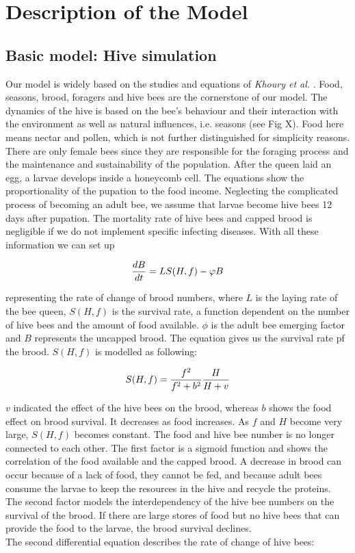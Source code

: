 \section{Description of the Model}
\subsection{Basic model: Hive simulation}
	Our model is widely based on the studies and equations of \textit{Khoury et al.} \cite{khoury13}. Food, seasons, brood, foragers and hive bees are the cornerstone of our model. The dynamics of the hive is based on the bee's behaviour and their interaction with the environment as well as natural influences, i.e. seasons (see Fig X). Food here means nectar and pollen, which is not further distinguished for simplicity reasons. There are only female bees since they are responsible for the foraging process and the maintenance and sustainability of the population. After the queen laid an egg, a larvae develops inside a honeycomb cell. The equations show the proportionality of the pupation to the food income. Neglecting the complicated process of becoming an adult bee, we assume that larvae become hive bees 12 days after pupation. The mortality rate of hive bees and capped brood is negligible if we do not implement specific infecting diseases. With all these information we can set up
	
	\begin{equation}\label{eq:changeBroodNumbers}
		{dB \over dt} = LS(H,f)-\phi B
	\end{equation}
	
	representing the rate of change of brood numbers, where $L$ is the laying rate of the bee queen, $S(H,f)$ is the survival rate, a function dependent on the number of hive bees and the amount of food available. $\phi$ is the adult bee emerging factor and $B$ represents the uncapped brood. The equation gives us the survival rate pf the brood. $S(H,f)$ is modelled as following:
	
	\begin{equation}\label{eq:functionHiveBeesFood}
		S(H,f)={f^2 \over f^2+b^2}{H \over H+v}
	\end{equation}
	
	$v$ indicated the effect of the hive bees on the brood, whereas $b$ shows the food effect on brood survival. It decreases as food increases. As $f$ and $H$ become very large, $S(H,f)$ becomes constant. The food and hive bee number is no longer connected to each other. The first factor is a sigmoid function and shows the correlation of the food available and the capped brood. A decrease in brood can occur because of a lack of food, they cannot be fed, and because adult bees consume the larvae to keep the resources in the hive and recycle the proteins. The second factor models the interdependency of the hive bee numbers on the survival of the brood. If there are large stores of food but no hive bees that can provide the food to the larvae, the brood survival declines.  
	\\
	The second differential equation describes the rate of change of hive bees:
	

